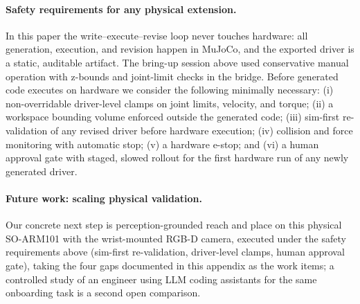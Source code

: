 \paragraph{Safety requirements for any physical extension.}
\label{app:safety}
In this paper the write--execute--revise loop never touches
hardware: all generation, execution, and revision happen in MuJoCo,
and the exported driver is a static, auditable artifact. The
bring-up session above used conservative manual operation with
z-bounds and joint-limit checks in the bridge. Before generated
code executes on hardware we consider the following minimally
necessary: (i) non-overridable driver-level clamps on joint limits,
velocity, and torque; (ii) a workspace bounding volume enforced
outside the generated code; (iii) sim-first re-validation of any
revised driver before hardware execution; (iv) collision and force
monitoring with automatic stop; (v) a hardware e-stop; and (vi) a
human approval gate with staged, slowed rollout for the first
hardware run of any newly generated driver.

\paragraph{Future work: scaling physical validation.}
Our concrete next step is perception-grounded reach and place on
this physical SO-ARM101 with the wrist-mounted RGB-D camera,
executed under the safety requirements above (sim-first
re-validation, driver-level clamps, human approval gate), taking
the four gaps documented in this appendix as the work items; a
controlled study of an engineer using LLM coding assistants for
the same onboarding task is a second open comparison.
